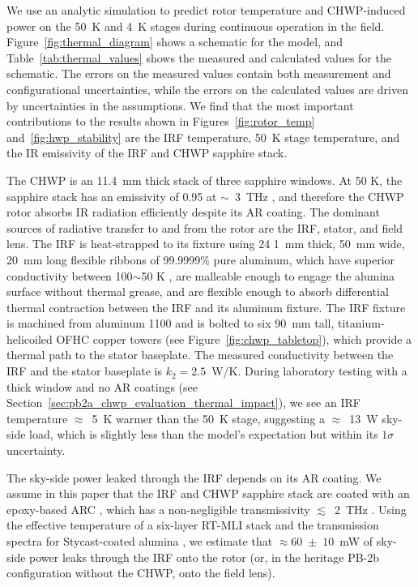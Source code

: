 We use an analytic simulation to predict rotor temperature and CHWP-induced power on the 50~K and 4~K stages during continuous operation in the field. Figure~\ref{fig:thermal_diagram} shows a schematic for the model, and Table~\ref{tab:thermal_values} shows the measured and calculated values for the schematic. The errors on the measured values contain both measurement and configurational uncertainties, while the errors on the calculated values are driven by uncertainties in the assumptions. We find that the most important contributions to the results shown in Figures~\ref{fig:rotor_temp} and~\ref{fig:hwp_stability} are the IRF temperature, 50~K stage temperature, and the IR emissivity of the IRF and CHWP sapphire stack.
 
The CHWP is an 11.4~mm thick stack of three sapphire windows. At 50 K, the sapphire stack has an emissivity of 0.95 at $\sim$~3~THz \cite{oxford_instruments_windows_nodate}, and therefore the CHWP rotor absorbs IR radiation efficiently despite its AR coating. The dominant sources of radiative transfer to and from the rotor are the IRF, stator, and field lens. The IRF is heat-strapped to its fixture using 24 1~mm thick, 50~mm wide, 20~mm long flexible ribbons of 99.9999\% pure aluminum, which have superior conductivity between 100$\sim$50 K \cite{Woodcraft2005}, are malleable enough to engage the alumina surface without thermal grease, and are flexible enough to absorb differential thermal contraction between the IRF and its aluminum fixture. The IRF fixture is machined from aluminum 1100 and is bolted to six 90~mm tall, titanium-helicoiled OFHC copper towers (see Figure~\ref{fig:chwp_tabletop}), which provide a thermal path to the stator baseplate. The measured conductivity between the IRF and the stator baseplate is $k_{2} = 2.5$~W/K. During laboratory testing with a thick window and no AR coatings (see Section~\ref{sec:pb2a_chwp_evaluation_thermal_impact}), we see an IRF temperature $\approx$~5~K warmer than the 50~K stage, suggesting a $\approx$~13~W sky-side load, which is slightly less than the model's expectation but within its $1 \sigma$ uncertainty.

The sky-side power leaked through the IRF depends on its AR coating. We assume in this paper that the IRF and CHWP sapphire stack are coated with an epoxy-based ARC \cite{rosen_epoxy-based_2013}, which has a non-negligible transmissivity $\lesssim$~2~THz \cite{halpern_far_1986}. Using the effective temperature of a six-layer RT-MLI stack \cite{choi_radio-transparent_2013} and the transmission spectra for Stycast-coated alumina \cite{inoue_cryogenic_2014}, we estimate that $\approx 60 \; \pm \; 10$~mW of sky-side power leaks through the IRF onto the rotor (or, in the heritage PB-2b configuration without the CHWP, onto the field lens).
 
